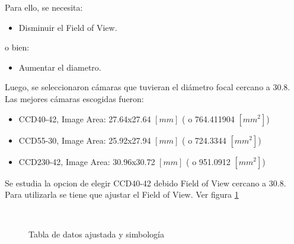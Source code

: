 \documentclass[a4paper,10pt]{article}
\begin{document}
Para ello, se necesita:
\begin{itemize}
\item Disminuir el Field of View.
\end{itemize}
o bien:
\begin{itemize}
\item Aumentar el diametro.
\end{itemize}

Luego, se seleccionaron cámaras que tuvieran el diámetro focal cercano a 30.8.
Las mejores cámaras escogidas fueron:
\begin{itemize}
\item CCD40-42,  Image Area: 27.64x27.64 $[mm]$ ( o 764.411904 $[mm^2]$)
\item CCD55-30,  Image Area: 25.92x27.94 $[mm]$ ( o 724.3344   $[mm^2]$)
\item CCD230-42, Image Area: 30.96x30.72 $[mm]$ ( o 951.0912   $[mm^2]$)
\end{itemize}
Se estudia la opcion de elegir CCD40-42 debido Field of View cercano a 30.8. Para utilizarla se tiene que ajustar el Field of View.
Ver figura \ref{fig:ccd40p2}
\begin{figure}[ht!]
  \centering
  ~ 
  ~ 
  \caption{Tabla de datos ajustada y simbología}
  \label{fig:ccd40p2}
\end{figure}
\end{document}
